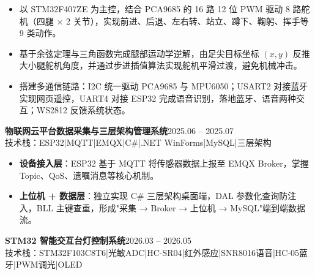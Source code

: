 \documentclass[10pt,a4paper]{article}
\newcommand{\projectblock}[3]{%
    {\bfseries\color{darktext}#1}\hfill{\color{graytext}#2}\\%
    {\small\color{graytext}#3}%
    \vspace{0.2em}%
}
\begin{document}
\begin{itemize}[leftmargin=1.5em, itemsep=2pt, parsep=0pt, topsep=2pt]
    \item 以 STM32F407ZE 为主控，结合 PCA9685 的 16 路 12 位 PWM 驱动 8 路舵机（四腿 $\times$ 2 关节），实现前进、后退、左右转、站立、蹲下、鞠躬、挥手等 9 类动作。
    \item 基于余弦定理与三角函数完成腿部运动学逆解，由足尖目标坐标 $(x, y)$ 反推大小腿舵机角度，并通过步进插值算法实现舵机平滑过渡，避免机械冲击。
    \item 搭建多通信链路：I2C 统一驱动 PCA9685 与 MPU6050；USART2 对接蓝牙实现网页遥控，UART4 对接 ESP32 完成语音识别，落地蓝牙、语音两种交互；WS2812 反馈系统状态。
\end{itemize}

\vspace{0.15em}

\projectblock{物联网云平台数据采集与三层架构管理系统}{2025.06 -- 2025.07}{技术栈：ESP32\hspace{0.3em}|\hspace{0.3em}MQTT\hspace{0.3em}|\hspace{0.3em}EMQX\hspace{0.3em}|\hspace{0.3em}C\#\hspace{0.3em}|\hspace{0.3em}.NET WinForms\hspace{0.3em}|\hspace{0.3em}MySQL\hspace{0.3em}|\hspace{0.3em}三层架构}

\begin{itemize}[leftmargin=1.5em, itemsep=2pt, parsep=0pt, topsep=2pt]
    \item \textbf{设备接入层}：ESP32 基于 MQTT 将传感器数据上报至 EMQX Broker，掌握 Topic、QoS、遗嘱消息等核心机制。
    \item \textbf{上位机 + 数据层}：独立实现 C\# 三层架构桌面端，DAL 参数化查询防注入，BLL 主键查重，形成"采集 → Broker → 上位机 → MySQL"端到端数据流。
\end{itemize}

\vspace{0.15em}

\projectblock{STM32 智能交互台灯控制系统}{2026.03 -- 2026.05}{技术栈：STM32F103C8T6\hspace{0.3em}|\hspace{0.3em}光敏ADC\hspace{0.3em}|\hspace{0.3em}HC-SR04\hspace{0.3em}|\hspace{0.3em}红外感应\hspace{0.3em}|\hspace{0.3em}SNR8016语音\hspace{0.3em}|\hspace{0.3em}HC-05蓝牙\hspace{0.3em}|\hspace{0.3em}PWM调光\hspace{0.3em}|\hspace{0.3em}OLED}
\end{document}
